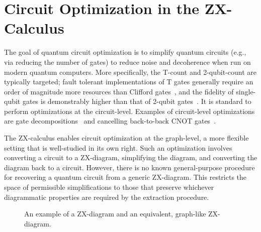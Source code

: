 \section{Circuit Optimization in the ZX-Calculus}\label{sec:zx-circ-opt}


The goal of quantum circuit optimization is to simplify quantum circuits (e.g., via reducing the number of gates) to reduce noise and decoherence when run on modern quantum computers.
More specifically, the T-count and 2-qubit-count are typically targeted; fault tolerant implementations of T gates generally require an order of magnitude more resources than Clifford gates~\cite{campbell2017roads}, and the fidelity of single-qubit gates is demonstrably higher than that of 2-qubit gates~\cite{ballance2016high}.
It is standard to perform optimizations at the circuit-level.
Examples of circuit-level optimizations are gate decompositions~\cite{vartiainen2004efficient} and cancelling back-to-back CNOT gates~\cite{garcia2011equivalent}.

The ZX-calculus enables circuit optimization at the graph-level, a more flexible setting that is well-studied in its own right.
Such an optimization involves converting a circuit to a ZX-diagram, simplifying the diagram, and converting the diagram back to a circuit. %
However, there is no known general-purpose procedure for recovering a quantum circuit from a generic ZX-diagram.
This restricts the space of permissible simplifications to those that preserve whichever diagrammatic properties are required by the extraction procedure.


\begin{figure}
\centering
{}
\caption{An example of a ZX-diagram and an equivalent, graph-like ZX-diagram.}
\label{fig:graph-like}
\end{figure}

